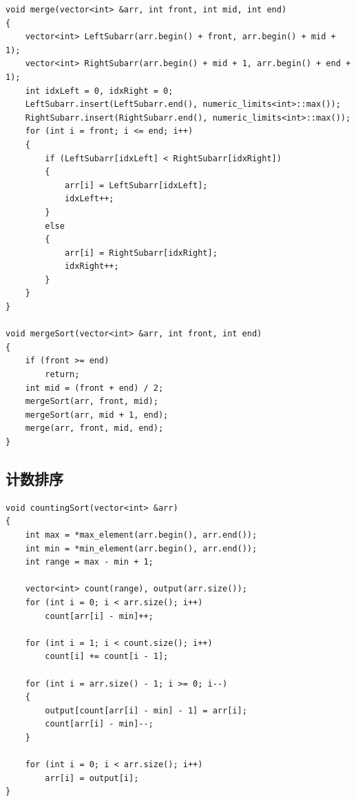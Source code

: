 \documentclass[12pt, a4paper, oneside]{ctexart}
\begin{document}
\begin{lstlisting}
void merge(vector<int> &arr, int front, int mid, int end)
{
    vector<int> LeftSubarr(arr.begin() + front, arr.begin() + mid + 1);
    vector<int> RightSubarr(arr.begin() + mid + 1, arr.begin() + end + 1);
    int idxLeft = 0, idxRight = 0;
    LeftSubarr.insert(LeftSubarr.end(), numeric_limits<int>::max());
    RightSubarr.insert(RightSubarr.end(), numeric_limits<int>::max());
    for (int i = front; i <= end; i++)
    {
        if (LeftSubarr[idxLeft] < RightSubarr[idxRight])
        {
            arr[i] = LeftSubarr[idxLeft];
            idxLeft++;
        }
        else
        {
            arr[i] = RightSubarr[idxRight];
            idxRight++;
        }
    }
}

void mergeSort(vector<int> &arr, int front, int end)
{
    if (front >= end)
        return;
    int mid = (front + end) / 2;
    mergeSort(arr, front, mid);
    mergeSort(arr, mid + 1, end);
    merge(arr, front, mid, end);
}
\end{lstlisting}

\subsection{计数排序}

\begin{lstlisting}
void countingSort(vector<int> &arr)
{
    int max = *max_element(arr.begin(), arr.end());
    int min = *min_element(arr.begin(), arr.end());
    int range = max - min + 1;

    vector<int> count(range), output(arr.size());
    for (int i = 0; i < arr.size(); i++)
        count[arr[i] - min]++;

    for (int i = 1; i < count.size(); i++)
        count[i] += count[i - 1];

    for (int i = arr.size() - 1; i >= 0; i--)
    {
        output[count[arr[i] - min] - 1] = arr[i];
        count[arr[i] - min]--;
    }

    for (int i = 0; i < arr.size(); i++)
        arr[i] = output[i];
}
\end{lstlisting}
\end{document}
